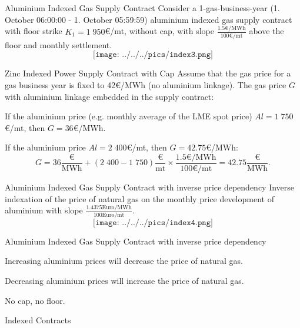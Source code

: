 


{Aluminium Indexed Gas Supply Contract}
Consider a 1-gas-business-year (1. October 06:00:00 - 1. October 05:59:59) aluminium indexed gas supply contract with floor strike $K_1=1\;950$€/mt, without cap, with slope $\frac{1.5\text{€/MWh}}{100\text{€/mt}}$ above the floor and monthly settlement.
$$\texttt{[image: ../../../pics/index3.png]}$$

{Zinc Indexed Power Supply Contract with Cap}
Assume that the gas price for a gas business year is fixed to \textcolor[rgb]{1.00,0.00,0.00}{42€/MWh} (no aluminium linkage). The gas price $G$ with aluminium linkage embedded in the supply contract:
\vspace{0.4cm}






	If the aluminium price (e.g. monthly average of the LME spot price) $Al=1\;750$€/mt, then \textcolor[rgb]{0.00,0.00,1.00}{$G=36$€/MWh}.


	If the aluminium price $Al=2\;400$€/mt, then \textcolor[rgb]{0.00,0.00,1.00}{$G=42.75$€/MWh}:
  $$G=36\frac{\text{€}}{\text{MWh}}+(2\;400-1\;750)\frac{\text{€}}{\text{mt}}\times\frac{1.5\text{€/MWh}}{100\text{€/mt}}=42.75\frac{\text{€}}{\text{MWh}}.$$





{Aluminium Indexed Gas Supply Contract with inverse price dependency}
Inverse indexation of the price of natural gas on the monthly price development of aluminium with slope $\frac{1.4375\text{Euro/MWh}}{100\text{Euro/mt}}$.
$$\texttt{[image: ../../../pics/index4.png]}$$

{Aluminium Indexed Gas Supply Contract with inverse price dependency}






	Increasing aluminium prices will decrease the price of natural gas.


	Decreasing aluminium prices will increase the price of natural gas.


	No cap, no floor.





{Indexed Contracts}


